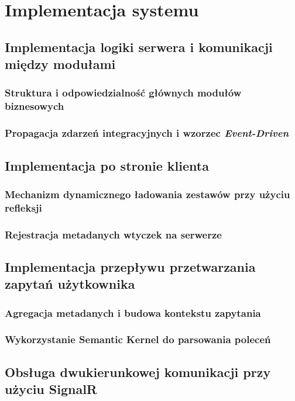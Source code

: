 \chapter{Implementacja systemu}
\label{cha:implementacja}

\section{Implementacja logiki serwera i komunikacji między modułami}
\label{sec:logika_serwera}

\subsection{Struktura i odpowiedzialność głównych modułów biznesowych}
\label{subsec:moduly_biznesowe}

\subsection{Propagacja zdarzeń integracyjnych i wzorzec \textit{Event-Driven}}
\label{subsec:event_driven}

\section{Implementacja po stronie klienta}
\label{sec:implementacja_klient}

\subsection{Mechanizm dynamicznego ładowania zestawów przy użyciu refleksji}
\label{subsec:refleksja}

\subsection{Rejestracja metadanych wtyczek na serwerze}
\label{subsec:rejestracja_wtyczek}

\section{Implementacja przepływu przetwarzania zapytań użytkownika}
\label{sec:przeplyw_zapytan}

\subsection{Agregacja metadanych i budowa kontekstu zapytania}
\label{subsec:budowa_kontekstu}

\subsection{Wykorzystanie Semantic Kernel do parsowania poleceń}
\label{subsec:parsowanie_polecen}

\section{Obsługa dwukierunkowej komunikacji przy użyciu SignalR}
\label{sec:obsluga_signalr}
